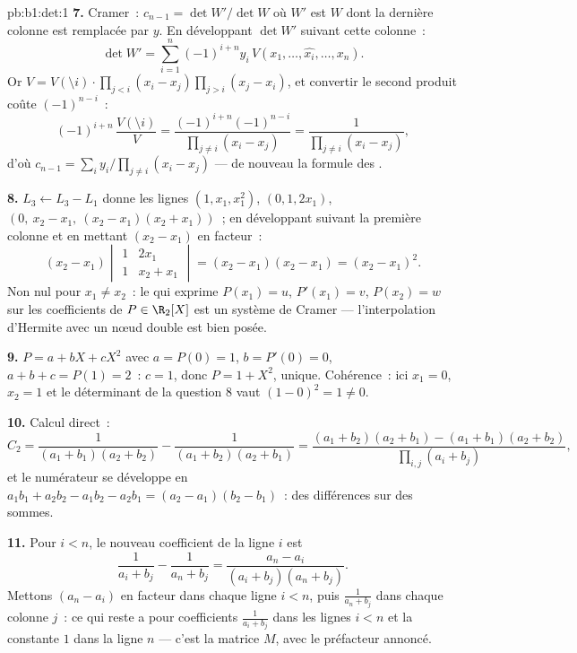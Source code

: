\begin{solution}{pb:b1:det:1}
\textbf{7.} Cramer~: $c_{n-1} = \det W'/\det W$ où $W'$ est $W$
dont la dernière colonne est remplacée par $y$. En développant
$\det W'$ suivant cette colonne~:
\[
\det W' = \sum_{i=1}^n (-1)^{i+n} y_i\,V(x_1, \dots, \widehat{x_i},
\dots, x_n) .
\]
Or $V = V(\setminus i)\cdot\prod_{j<i}(x_i - x_j)\prod_{j>i}
(x_j - x_i)$, et convertir le second produit coûte
$(-1)^{n-i}$~:
\[
(-1)^{i+n}\,\frac{V(\setminus i)}{V}
= \frac{(-1)^{i+n}(-1)^{n-i}}{\prod_{j\neq i}(x_i - x_j)}
= \frac{1}{\prod_{j\neq i}(x_i - x_j)} ,
\]
d'où $c_{n-1} = \sum_i y_i/\prod_{j \neq i}(x_i - x_j)$ ---
de nouveau la formule des .

\textbf{8.} $L_3 \leftarrow L_3 - L_1$ donne les lignes $(1, x_1,
x_1^2)$, $(0, 1, 2x_1)$, $(0,\ x_2 - x_1,\ (x_2-x_1)(x_2+x_1))$~;
en développant suivant la première colonne et en mettant $(x_2 - x_1)$
en facteur~:
\[
(x_2 - x_1)\begin{vmatrix} 1 & 2x_1\\ 1 & x_2 + x_1
\end{vmatrix} = (x_2 - x_1)(x_2 - x_1) = (x_2 - x_1)^2 .
\]
Non nul pour $x_1 \neq x_2$~: le  qui exprime
$P(x_1) = u$, $P'(x_1) = v$, $P(x_2) = w$ sur les coefficients de
$P \in \R_2[X]$ est un système de Cramer --- l'interpolation
d'Hermite avec un nœud double est bien posée.

\textbf{9.} $P = a + bX + cX^2$ avec $a = P(0) = 1$, $b = P'(0)
= 0$, $a + b + c = P(1) = 2$~: $c = 1$, donc $P = 1 + X^2$, unique.
Cohérence~: ici $x_1 = 0$, $x_2 = 1$ et le déterminant de
la question 8 vaut $(1 - 0)^2 = 1 \neq 0$.

\textbf{10.} Calcul direct~:
\[
C_2 = \frac{1}{(a_1+b_1)(a_2+b_2)} - \frac{1}{(a_1+b_2)(a_2+b_1)}
= \frac{(a_1+b_2)(a_2+b_1) - (a_1+b_1)(a_2+b_2)}
{\prod_{i,j}(a_i+b_j)} ,
\]
et le numérateur se développe en $a_1b_1 + a_2b_2 - a_1b_2 - a_2b_1
= (a_2 - a_1)(b_2 - b_1)$~: des différences sur des sommes.

\textbf{11.} Pour $i < n$, le nouveau coefficient de la ligne $i$ est
\[
\frac{1}{a_i + b_j} - \frac{1}{a_n + b_j}
= \frac{a_n - a_i}{(a_i + b_j)(a_n + b_j)} .
\]
Mettons $(a_n - a_i)$ en facteur dans chaque ligne $i < n$, puis
$\frac1{a_n + b_j}$ dans chaque colonne $j$~: ce qui reste a pour
coefficients $\frac1{a_i + b_j}$ dans les lignes $i < n$ et la
constante $1$ dans la ligne $n$ --- c'est la matrice $M$, avec le
préfacteur annoncé.


\end{solution}
